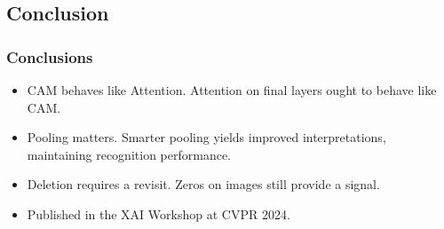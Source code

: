 \subsection*{Conclusion}
\begin{frame}
    \frametitle{Conclusions}
    \small
    \begin{itemize}
        \item CAM behaves like Attention. Attention on final layers ought to behave like CAM.
        \item Pooling matters. Smarter pooling yields improved interpretations, maintaining recognition performance. 
        \item Deletion requires a revisit. Zeros on images still provide a signal.
        \item Published in the XAI Workshop at CVPR 2024.
    \end{itemize}
\end{frame}